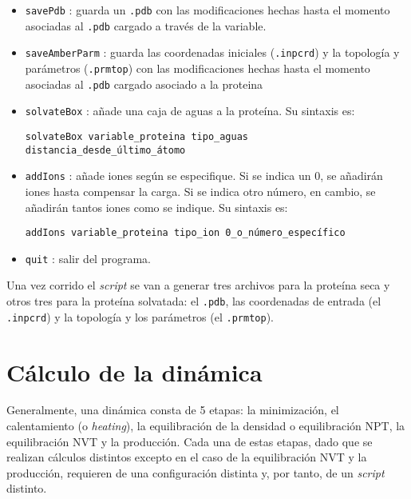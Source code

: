 \begin{itemize}
                \item   \texttt{savePdb} : guarda un \texttt{.pdb} con las modificaciones hechas hasta el momento asociadas al \texttt{.pdb} cargado a través de la variable.
                
                \item   \texttt{saveAmberParm} : guarda las coordenadas iniciales (\texttt{.inpcrd}) y la topología y parámetros (\texttt{.prmtop}) con las modificaciones hechas hasta el momento asociadas al \texttt{.pdb} cargado asociado a la proteina
                
                \item \texttt{solvateBox} : añade una caja de aguas a la proteína. Su sintaxis es:
                    \begin{center}
                        \texttt{solvateBox variable\_proteina tipo\_aguas distancia\_desde\_último\_átomo}
                    \end{center}
                    
                \item \texttt{addIons} : añade iones según se especifique. Si se indica un 0, se añadirán iones hasta compensar la carga. Si se indica otro número, en cambio, se añadirán tantos iones como se indique. Su sintaxis es:
                    \begin{center}
                        \texttt{addIons variable\_proteina tipo\_ion 0\_o\_número\_específico}
                    \end{center}
                    
                \item \texttt{quit} : salir del programa.
            \end{itemize}
            
            Una vez corrido el \textit{script} se van a generar tres archivos para la proteína seca y otros tres para la proteína solvatada: el \texttt{.pdb}, las coordenadas de entrada (el \texttt{.inpcrd}) y la topología y los parámetros (el \texttt{.prmtop}).
            
            
\section{Cálculo de la dinámica}
    Generalmente, una dinámica consta de 5 etapas: la minimización, el calentamiento (o \textit{heating}), la equilibración de la densidad o equilibración NPT, la equilibración NVT y la producción. Cada una de estas etapas, dado que se realizan cálculos distintos excepto en el caso de la equilibración NVT y la producción, requieren de una configuración distinta y, por tanto, de un \textit{script} distinto.\par
    
